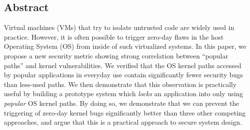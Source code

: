 \subsection*{Abstract}

%
%

%
%

Virtual machines (VMs) that try to isolate untrusted code are widely used in practice. 
However, it is often possible to trigger zero-day flaws
in the host Operating System (OS) from inside of such virtualized systems.
%
In this paper, we propose a new security metric showing strong correlation between ``popular paths'' 
and kernel vulnerabilities. We verified that the OS kernel paths accessed 
by popular applications in everyday use contain significantly fewer security bugs than less-used paths.  We then demonstrate that this observation is
practically useful by building a prototype system which \textit{locks} an
application into only using \textit{popular} OS kernel paths.  By doing so, we
demonstrate that
we can prevent the triggering of zero-day kernel bugs
significantly better than three other competing approaches, and argue that
this is a practical approach to  secure system design.
